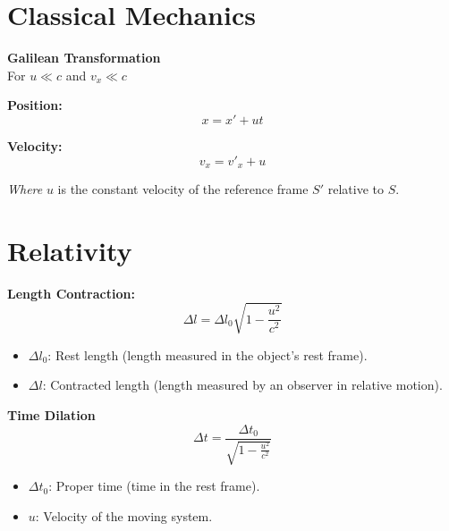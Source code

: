 \documentclass[a4paper,11pt]{article}
\renewcommand{\textbf}[1]{{\scriptsize	\bfseries #1}}
\begin{document}
\begin{footnotesize}
\begin{multicols}{2}
\section*{Classical Mechanics}

\begin{minipage}{\linewidth}

\textbf{Galilean Transformation} \\[-0.2cm]
For $u \ll c$ and $v_x \ll c$

\textbf{Position:}
\[
x = x' + ut
\]

\textbf{Velocity:}
\[
v_x = v'_x + u
\]

\textit{Where } $u$ is the constant velocity of the reference frame $S'$ relative to $S$.

\end{minipage}


\section*{Relativity}

\begin{minipage}{\linewidth}

\textbf{Length Contraction:} \\[-0.2cm]
\[
\Delta l = \Delta l_0 \sqrt{1 - \frac{u^2}{c^2}}
\]

\begin{itemize}
    \item $\Delta l_0$: Rest length (length measured in the object's rest frame).
    \item $\Delta l$: Contracted length (length measured by an observer in relative motion).
\end{itemize}

\end{minipage}


\begin{minipage}{\linewidth}

\textbf{Time Dilation} \\[-0.2cm]
\[
\Delta t = \frac{\Delta t_0}{\sqrt{1 - \frac{u^2}{c^2}}}
\]
\begin{itemize}
    \item $\Delta t_0$: Proper time (time in the rest frame).
    \item $u$: Velocity of the moving system.
\end{itemize}

\end{minipage}






\end{multicols}
\end{footnotesize}
\end{document}
